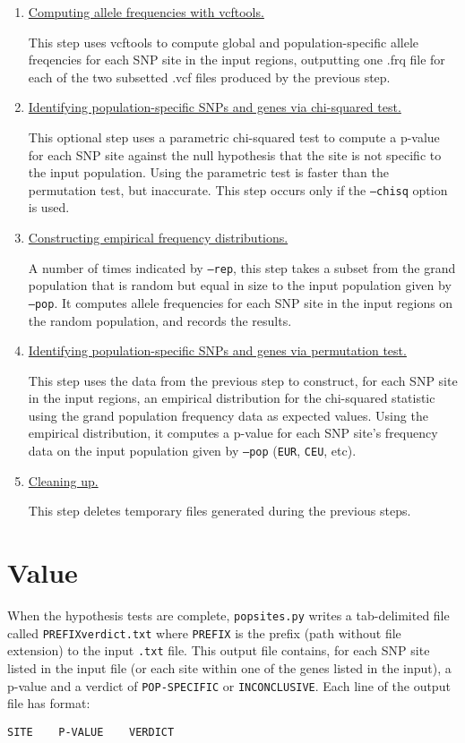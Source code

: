 \documentclass[12pt]{scrartcl}
\begin{document}
\begin{enumerate}
\item \underline{Computing allele frequencies with vcftools.}

This step uses vcftools to compute global and population-specific allele freqencies for each SNP site in the input regions, outputting one .frq file for each of the two subsetted .vcf files produced by the previous step.

\item \underline{Identifying population-specific SNPs and genes via chi-squared test.}

This optional step uses a parametric chi-squared test to compute a p-value
for each SNP site against the null hypothesis that the site is not specific to the input population. Using the parametric test is faster than the permutation test, but inaccurate. This step occurs only if the \texttt{--chisq} option is used.

\item \underline{Constructing empirical frequency distributions.}

A number of times indicated by \texttt{--rep}, this step takes a subset from the grand population that is random but equal in size to the input population given by \texttt{--pop}. It computes allele frequencies for each SNP site in the input regions on the random population, and records the results.

\item \underline{Identifying population-specific SNPs and genes via permutation test.}

This step uses the data from the previous step to construct, for each SNP site in the input regions, an empirical distribution for the chi-squared statistic using the grand population frequency data as expected values. Using the empirical distribution, it computes a p-value for each SNP site's frequency data on the input population given by \texttt{--pop} (\texttt{EUR}, \texttt{CEU}, etc).

\item \underline{Cleaning up.}

This step deletes temporary files generated during the previous steps.
\end{enumerate}
\section{Value}
When the hypothesis tests are complete,  \texttt{pop{\textunderscore}sites.py} writes a tab-delimited file called \texttt{PREFIX{\textunderscore}verdict.txt} where \texttt{PREFIX} is the prefix (path without file extension)  to the input \texttt{.txt} file. This output file contains, for each SNP site listed in the input file (or each site within one of the genes listed in the input), a p-value and a verdict of \texttt{POP-SPECIFIC} or \texttt{INCONCLUSIVE}. Each line of the output file has format:

\begin{verbatim}
SITE    P-VALUE    VERDICT
\end{verbatim}
\end{document}
